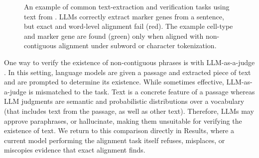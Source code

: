 \documentclass[pdflatex,lineno,referee,sn-vancouver-num]{sn-jnl}
\theoremstyle{thmstyleone}
\theoremstyle{thmstylethree}
\theoremstyle{thmstyletwo}
\begin{document}
\begin{figure}[!t]
{{{
  }
}}

\caption{An example of common text-extraction and verification tasks using text from \citep{Hildreth2021}. LLMs correctly extract marker genes from a sentence, but exact and word-level alignment fail (red). The example cell-type and marker gene are found (green) only when aligned with non-contiguous alignment under subword or character tokenization.}
\label{fig:example}
\end{figure}

One way to verify the existence of non-contiguous phrases is with LLM-as-a-judge \citep{gu2025surveyllmasajudge}. In this setting, language models are given a passage and extracted piece of text and are prompted to determine its existence. While sometimes effective, LLM-as-a-judge is mismatched to the task. Text is a concrete feature of a passage whereas LLM judgments are semantic and probabilistic distributions over a vocabulary (that includes text from the passage, as well as other text). Therefore, LLMs may approve paraphrases, or hallucinate, making them unsuitable for verifying the existence of text. We return to this comparison directly in Results, where a current model performing the alignment task itself refuses, misplaces, or miscopies evidence that exact alignment finds.
\end{document}
